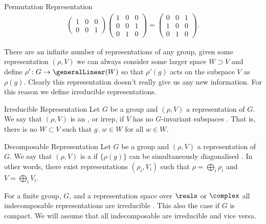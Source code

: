 \documentclass[fleqn]{NotesClass}
\newcommand{\action}{\mathbin{.}}
\begin{document}
\begin{exm}{Permutation Representation}{}
\begin{multline}
\begin{pmatrix}
                1 & 0 & 0\\
                0 & 0 & 1
            \end{pmatrix}
            \begin{pmatrix}
                1 & 0 & 0\\
                0 & 0 & 1\\
                0 & 1 & 0
            \end{pmatrix}
            = 
            \begin{pmatrix}
                0 & 0 & 1\\
                1 & 0 & 0\\
                0 & 1 & 0
            \end{pmatrix}
            .
        \end{multline}
    \end{exm}
    
    There are an infinite number of representations of any group, given some representation \((\rho, V)\) we can always consider some larger space \(W \supset V\) and define \(\rho' \colon G \to \generalLinear(W)\) so that \(\rho'(g)\) acts on the subspace \(V\) as \(\rho(g)\).
    Clearly this representation doesn't really give us any new information.
    For this reason we define irreducible representations.
    
    \begin{dfn}{Irreducible Representation}{}
        Let \(G\) be a group and \((\rho, V)\) a representation of \(G\).
        We say that \((\rho, V)\) is an , or irrep, if \(V\) has no \(G\)-invariant subspaces \cite{hamermesh}.
        That is, there is no \(W \subset V\) such that \(g \action w \in W\) for all \(w \in W\).
    \end{dfn}

    \begin{dfn}{Decomposable Representation}{}
        Let \(G\) be a group and \((\rho, V)\) a representation of \(G\).
        We say that \((\rho, V)\) is a  if \(\{\rho(g)\}\) can be simultaneously diagonalised \cite{hamermesh}.
        In other words, there exist representations \((\rho_i, V_i)\) such that \(\rho = \bigoplus_i \rho_i\) and \(V = \bigoplus_i V_i\).
    \end{dfn}
    
    For a finite group, \(G\), and a representation space over \(\reals\) or \(\complex\) all indecomposable representations are irreducible \cite{hamermesh}.
    This also the case if \(G\) is compact.
    We will assume that all indecomposable are irreducible and vice versa.
    
\end{document}
